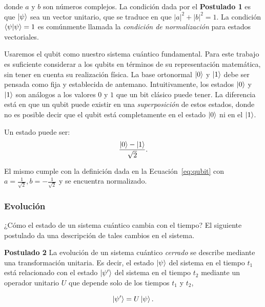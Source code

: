 donde $a$ y $b$ son números complejos. La condición dada por el \textbf{Postulado 1} es que $\ket{\psi}$ sea un vector unitario, que se traduce en que $|a|^2+|b|^2=1$. La condición $\braket{\psi|\psi}=1$ es comúnmente llamada la \emph{condición de normalización} para estados vectoriales.

Usaremos el qubit como nuestro sistema cuántico fundamental. Para este trabajo es suficiente considerar a los qubits en términos de su representación matemática, sin tener en cuenta su realización física. La base ortonormal $\ket{0}$ y $\ket{1}$ debe ser pensada como fija y establecida de antemano. Intuitivamente, los estados $\ket{0}$ y $\ket{1}$ son análogos a los valores $0$ y $1$ que un bit clásico puede tener. La diferencia está en que un qubit puede existir en una \emph{superposición} de estos estados, donde no es posible decir que el qubit está completamente en el estado  $\ket{0}$ ni en el $\ket{1}$.

\begin{ejemplo}
Un estado puede ser:
\begin{equation*}
    \frac{\ket{0}-\ket{1}}{\sqrt{2}}.
\end{equation*}

El mismo cumple con la definición dada en la Ecuación~\ref{eq:qubit} con $a=\frac{1}{\sqrt{2}}, b=-\frac{1}{\sqrt{2}}$ y se encuentra normalizado.

\end{ejemplo}

\subsubsection{Evolución}

¿Cómo el estado de un sistema cuántico cambia con el tiempo? El siguiente postulado da una descripción de tales cambios en el sistema.

\begin{displayquote}
    \textbf{Postulado 2}
    La evolución de un sistema cuántico \emph{cerrado} se describe mediante una transformación unitaria. Es decir, el estado $\ket{\psi}$ del sistema en el tiempo $t_1$ está relacionado con el estado $\ket{\psi'}$ del sistema en el tiempo $t_2$ mediante un operador unitario $U$ que depende solo de los tiempos $t_1$ y $t_2$,

    \begin{equation}
        \ket{\psi'} = U\ket{\psi}.
    \end{equation}
\end{displayquote}

